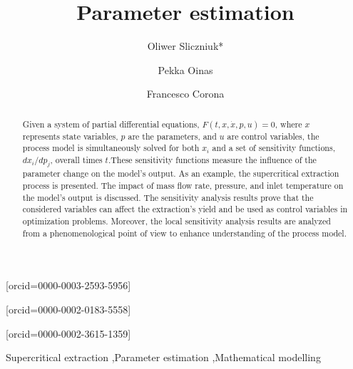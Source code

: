 \documentclass[a4paper,fleqn]{cas-dc}
\begin{document}
 

\title[mode=title]{Parameter estimation}                      


\author[1]{Oliwer Sliczniuk*}[orcid=0000-0003-2593-5956]
\cormark[1]

\author[1]{Pekka Oinas}[orcid=0000-0002-0183-5558]

\author[1]{Francesco Corona}[orcid=0000-0002-3615-1359]

\address[1]{Aalto University, School of Chemical Engineering, Espoo, 02150, Finland}


\begin{abstract}
Given a system of partial differential equations, $F(t,x,\dot{x},p,u)=0$, where $x$ represents state variables, $p$ are the parameters, and $u$ are control variables, the process model is simultaneously solved for both $x_i$ and a set of sensitivity functions, $dx_i/dp_j$, overall times $t$.These sensitivity functions measure the influence of the parameter change on the model's output. As an example, the supercritical extraction process is presented. The impact of mass flow rate, pressure, and inlet temperature on the model's output is discussed. The sensitivity analysis results prove that the considered variables can affect the extraction's yield and be used as control variables in optimization problems. Moreover, the local sensitivity analysis results are analyzed from a phenomenological point of view to enhance understanding of the process model.

\end{abstract}

\begin{keywords}
Supercritical extraction \sep Parameter estimation \sep Mathematical modelling
\end{keywords}

\maketitle
\end{document}
